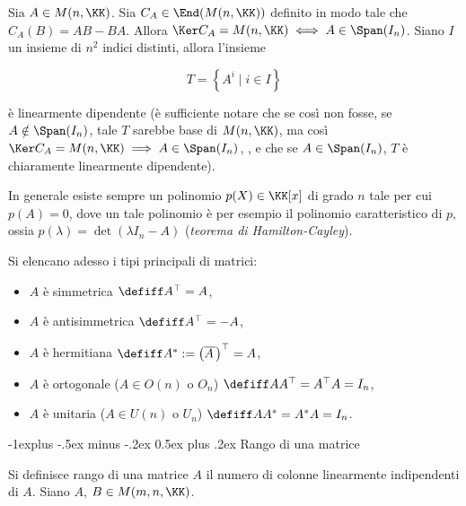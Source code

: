 \documentclass[10pt,landscape]{article}
\makeatletter
\renewcommand{\subsection}{\@startsection{subsection}{2}{0mm}%
	{-1explus -.5ex minus -.2ex}%
	{0.5ex plus .2ex}%
	{\normalfont\normalsize\bfseries}}
\makeatother
\begin{document}
\begin{multicols}{3}
		Sia $A \in M(n, \KK)$. Sia $C_A \in \End(M(n, \KK))$ definito in modo
		tale che $C_A(B) = AB - BA$. Allora $\Ker C_A = M(n, \KK)
		\iff A \in \Span(I_n)$. Siano $I$ un insieme di $n^2$ indici
		distinti, allora l'insieme
		
		\[ T = \left\{ A^i \mid i \in I \right\} \]
		
		è linearmente dipendente (è sufficiente notare che
		se così non fosse, se $A \notin \Span(I_n)$,
		tale $T$ sarebbe base di $M(n, \KK)$, ma
		così $\Ker C_A = M(n, \KK) \implies A \in \Span(I_n)$,
		\Lightning{}, e che se $A \in \Span(I_n)$, $T$
		è chiaramente linearmente dipendente).
		
		In generale esiste sempre un polinomio $p(X) \in \KK[x]$
		di grado $n$ tale per cui $p(A) = 0$, dove un tale polinomio
		è per esempio il polinomio caratteristico di $p$, ossia $p(\lambda)=
		\det(\lambda I_n - A)$ (\textit{teorema di 
			Hamilton-Cayley}).
		
		Si elencano adesso i tipi principali di matrici:
		
		\begin{itemize}
			\item $A$ è simmetrica $\defiff A^\top = A$,
			\item $A$ è antisimmetrica $\defiff A^\top = -A$,
			\item $A$ è hermitiana $\defiff A^* := \left(\overline{A\,}\right)^\top = A$,
			\item $A$ è ortogonale ($A \in O(n)$ o $O_n$) $\defiff AA^\top = A^\top A = I_n$,
			\item $A$ è unitaria ($A \in U(n)$ o $U_n$) $\defiff AA^* = A^*A = I_n$.
		\end{itemize}
		
		\subsection{Rango di una matrice}
		
		Si definisce rango di una matrice $A$ il numero di colonne linearmente
		indipendenti di $A$. Siano $A$, $B \in M(m, n, \KK)$.
		

\end{multicols}
\end{document}
